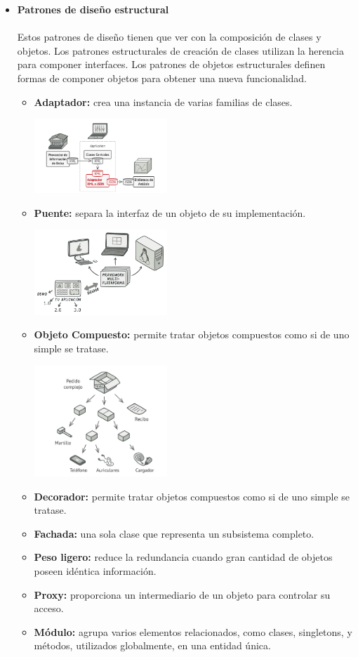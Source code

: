 \documentclass[twoside,twocolumn]{article}
\begin{document}
\begin{itemize}
	\item \textbf{Patrones de diseño estructural}
	\\
	\\Estos patrones de diseño tienen que ver con la composición de clases y objetos. Los patrones estructurales de creación de clases utilizan la herencia para componer interfaces. Los patrones de objetos estructurales definen formas de componer objetos para obtener una nueva funcionalidad.\cite{r}
	\begin{itemize}
		\item \textbf{Adaptador:}	crea una instancia de varias familias de clases.
			\begin{center}
			\includegraphics[width=5cm]{./Imagenes/7} 
		\end{center}
		\item \textbf{Puente:} separa la interfaz de un objeto de su implementación.
		\begin{center}
			\includegraphics[width=5cm]{./Imagenes/8} 
		\end{center}
		\item \textbf{Objeto Compuesto:} permite tratar objetos compuestos como si de uno simple se tratase.
			\begin{center}
			\includegraphics[width=5cm]{./Imagenes/9} 
		\end{center}
		\item \textbf{Decorador:}	permite tratar objetos compuestos como si de uno simple se tratase.
		\item \textbf{Fachada:} una sola clase que representa un subsistema completo.
		\item \textbf{Peso ligero:} reduce la redundancia cuando gran cantidad de objetos poseen idéntica información.
		\item \textbf{Proxy:} proporciona un intermediario de un objeto para controlar su acceso.
		\item \textbf{Módulo:} agrupa varios elementos relacionados, como clases, singletons, y métodos, utilizados globalmente, en una entidad única.
	\end{itemize}
	

\end{itemize}
\end{document}
